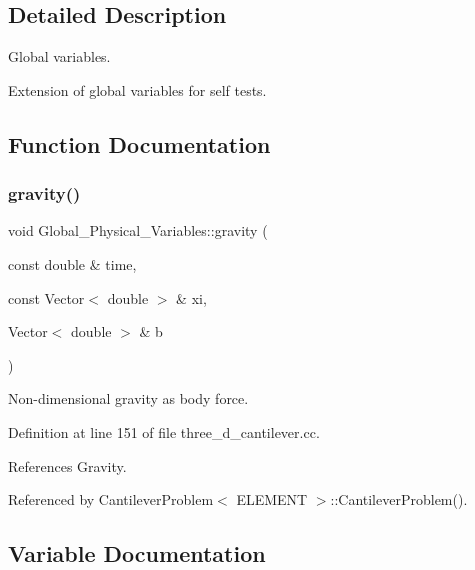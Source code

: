 \subsection{Detailed Description}
Global variables. 

Extension of global variables for self tests. 

\subsection{Function Documentation}
\mbox{\label{namespaceGlobal__Physical__Variables_a0777aef63372db7f91ad894c38159681}} 
\subsubsection{\texorpdfstring{gravity()}{gravity()}}
{\footnotesize\ttfamily void Global\+\_\+\+Physical\+\_\+\+Variables\+::gravity (\begin{DoxyParamCaption}\item[{const double \&}]{time,  }\item[{const Vector$<$ double $>$ \&}]{xi,  }\item[{Vector$<$ double $>$ \&}]{b }\end{DoxyParamCaption})}



Non-\/dimensional gravity as body force. 



Definition at line 151 of file three\+\_\+d\+\_\+cantilever.\+cc.



References Gravity.



Referenced by Cantilever\+Problem$<$ E\+L\+E\+M\+E\+N\+T $>$\+::\+Cantilever\+Problem().



\subsection{Variable Documentation}
\mbox{\label{namespaceGlobal__Physical__Variables_a849754fa7155c1a31481674ce4845658}} 
